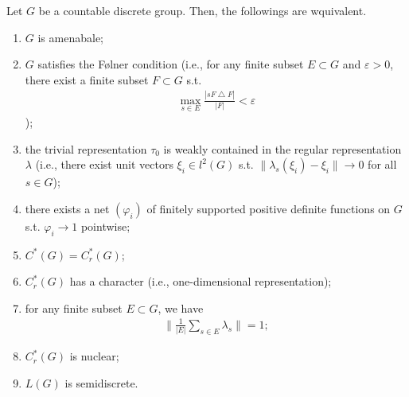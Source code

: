 \begin{theorem}
  Let $G$ be a countable discrete group.
  Then, the followings are wquivalent.
  \begin{enumerate}
  \item $G$ is amenabale;
  \item $G$ satisfies the F{\o}lner condition (i.e., for any finite subset $E \subset G$ and $\varepsilon > 0$, there exist a finite subset $F \subset G$ s.t.
    \begin{align*}
      \max_{s \in E} \frac{|sF\bigtriangleup F|}{|F|} < \varepsilon
    \end{align*}
    );
  \item the trivial representation $\tau_0$ is weakly contained in the regular representation $\lambda$ (i.e., there exist unit vectors $\xi_i \in l^2(G)$ s.t. $\|\lambda_s(\xi_i) - \xi_i\| \rightarrow 0$ for all $s\in G$);
  \item there exists a net $(\varphi_i)$ of finitely supported positive definite functions on $G$ s.t. $\varphi_i \rightarrow 1$ pointwise;
  \item $C^*(G) = C^*_r(G)$;
  \item $C^*_r(G)$ has a character (i.e., one-dimensional representation);
  \item for any finite subset $E \subset G$, we have
    \begin{align*}
      \|\frac{1}{|E|}\sum_{s \in E} \lambda_s\| = 1;
    \end{align*}
  \item $C^*_r(G)$ is nuclear;
  \item $L(G)$ is semidiscrete.
  \end{enumerate}
\end{theorem}


